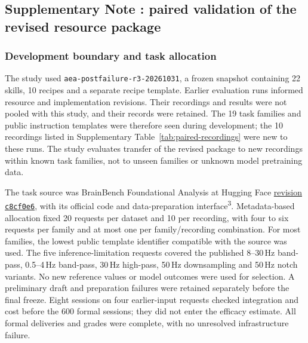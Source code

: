 \subsection*{Supplementary Note \thesuppnote: paired validation of the revised resource package}
\label{si:paired-validation}

\subsubsection*{Development boundary and task allocation}

The study used \texttt{aea-postfailure-r3-20261031}, a frozen snapshot containing 22 skills, 10 recipes and a separate recipe template. Earlier evaluation runs informed resource and implementation revisions. Their recordings and results were not pooled with this study, and their records were retained. The 19 task families and public instruction templates were therefore seen during development; the 10 recordings listed in Supplementary Table~\ref*{tab:paired-recordings} were new to these runs. The study evaluates transfer of the revised package to new recordings within known task families, not to unseen families or unknown model pretraining data.

The task source was BrainBench Foundational Analysis at Hugging Face \href{https://huggingface.co/datasets/xbb083/BrainBench/tree/c8cf0e6fc549d832e0d2de11f6e831b7bcb753a3}{revision \texttt{c8cf0e6}}, with its official code and data-preparation interface\textsuperscript{3}. Metadata-based allocation fixed 20 requests per dataset and 10 per recording, with four to six requests per family and at most one per family/recording combination. For most families, the lowest public template identifier compatible with the source was used. The five inference-limitation requests covered the published 8--30\,Hz band-pass, 0.5--4\,Hz band-pass, 30\,Hz high-pass, 50\,Hz downsampling and 50\,Hz notch variants. No new reference values or model outcomes were used for selection. A preliminary draft and preparation failures were retained separately before the final freeze. Eight sessions on four earlier-input requests checked integration and cost before the 600 formal sessions; they did not enter the efficacy estimate. All formal deliveries and grades were complete, with no unresolved infrastructure failure.

